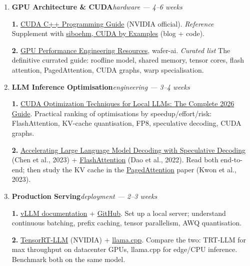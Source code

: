 \documentclass[11pt,a4paper]{article}
\begin{document}
\begin{enumerate}[leftmargin=2em,label=\textbf{Step \arabic*:},itemsep=0.7cm]
	\item \textbf{GPU Architecture \& CUDA}\hfill\textit{hardware --- 4--6 weeks}

	      \textbf{1.} \href{https://docs.nvidia.com/cuda/cuda-c-programming-guide/}{CUDA C++ Programming Guide} (NVIDIA official). \hfill\textit{Reference}
	      \newline \qquad Supplement with \href{https://github.com/siboehm/CUDAByExamples}{siboehm, CUDA by Examples} (blog + code).

	      \textbf{2.} \href{https://github.com/wafer-ai/gpu-perf-engineering-resources}{GPU Performance Engineering Resources}, wafer-ai.
	      \hfill\textit{Curated list}
	      \newline \qquad The definitive currated guide: roofline model, shared memory, tensor cores, flash attention, PagedAttention, CUDA graphs, warp specialisation.

	\item \textbf{LLM Inference Optimisation}\hfill\textit{engineering --- 3--4 weeks}

	      \textbf{1.} \href{https://localaimaster.com/blog/cuda-optimization-local-llms}{CUDA Optimization Techniques for Local LLMs: The Complete 2026 Guide}.
	      \newline \qquad Practical ranking of optimisations by speedup/effort/risk: FlashAttention, KV-cache quantisation, FP8, speculative decoding, CUDA graphs.

	      \textbf{2.} \href{https://arxiv.org/abs/2302.01318}{Accelerating Large Language Model Decoding with Speculative Decoding}
	      (Chen et al., 2023) + \href{https://arxiv.org/abs/2205.14135}{FlashAttention} (Dao et al., 2022).
	      \newline \qquad Read both end-to-end; then study the KV cache in the \href{https://arxiv.org/abs/2309.06180}{PagedAttention} paper (Kwon et al., 2023).

	\item \textbf{Production Serving}\hfill\textit{deployment --- 2--3 weeks}

	      \textbf{1.} \href{https://docs.vllm.ai/}{vLLM documentation} + \href{https://github.com/vllm-project/vllm}{GitHub}.
	      \newline \qquad Set up a local server; understand continuous batching, prefix caching, tensor parallelism, AWQ quantisation.

	      \textbf{2.} \href{https://github.com/NVIDIA/TensorRT-LLM}{TensorRT-LLM} (NVIDIA) + \href{https://github.com/ggerganov/llama.cpp}{llama.cpp}.
	      \newline \qquad Compare the two: TRT-LLM for max throughput on datacenter GPUs, llama.cpp for edge/CPU inference. Benchmark both on the same model.


\end{enumerate}
\end{document}
